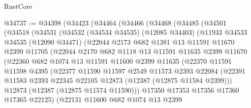 \begin{lexlean}{RustCore}
\begin{coremodule}
@34737 := @34398
    (@34423
      (@34464
        (@34466
          (@34468
            (@34485
              (@34501
                (@34518
                  (@34531
                    (@34532
                      (@34534 @34535)
                      (@12085 @34403)
                      (@11933
                        @34533
                        @34535
                        (@12090 @34471)
                        (@22044
                          @2173
                          @682
                          @1381
                          @13
                          @11591
                          @11670
                          @2399
                          @11705
                          (@22044
                            @2170
                            @682
                            @1118
                            @13
                            @11591
                            @11635
                            @2399
                            @11670
                            (@22360
                              @682
                              @1074
                              @13
                              @11591
                              @11600
                              @2399
                              @11635
                              (@22370
                                @11591
                                @11598
                                @4395
                                (@22377
                                  @11590
                                  @11597
                                  @2549
                                  @11573
                                  @2393
                                  @22084
                                  (@22391
                                    @11583
                                    @2393
                                    @22345
                                    @22105
                                    @12873
                                    (@12387 (@12875 @11584 @2399)))
                                  @12873
                                  (@12387 (@12875 @11574 @11590)))
                                @17350
                                @17353
                                @17356
                                @17360
                                @17365
                                @22125)
                              (@22131
                                @11600
                                @682
                                @1074
                                @13
                                @2399

\end{coremodule}
\end{lexlean}

